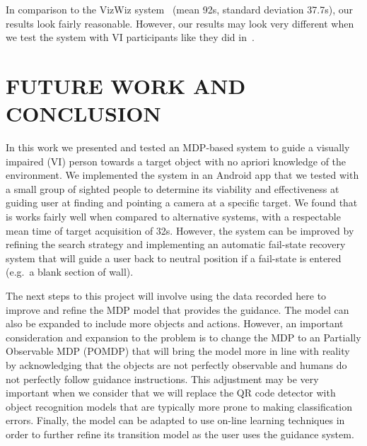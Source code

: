 \documentclass[a4paper, twoside]{article}
\begin{document}
In comparison to the VizWiz system~\cite{bigham2010vizwiz} (mean 92s, standard deviation 37.7s), our results look fairly reasonable. However, our results may look very different when we test the system with VI participants like they did in~\cite{bigham2010vizwiz}.

\section{\uppercase{Future Work and Conclusion}}\label{sec:conclusion}

\noindent In this work we presented and tested an MDP-based system to guide a visually impaired (VI) person towards a target object with no apriori knowledge of the environment. We implemented the system in an Android app that we tested with a small group of sighted people to determine its viability and effectiveness at guiding user at finding and pointing a camera at a specific target. We found that is works fairly well when compared to alternative systems, with a respectable mean time of target acquisition of 32s. However, the system can be improved by refining the search strategy and implementing an automatic fail-state recovery system that will guide a user back to neutral position if a fail-state is entered (e.g.\ a blank section of wall). 

The next steps to this project will involve using the data recorded here to improve and refine the MDP model that provides the guidance. The model can also be expanded to include more objects and actions. However, an important consideration and expansion to the problem is to change the MDP to an Partially Observable MDP (POMDP) that will bring the model more in line with reality by acknowledging that the objects are not perfectly observable and humans do not perfectly follow guidance instructions. This adjustment may be very important when we consider that we will replace the QR code detector with object recognition models that are typically more prone to making classification errors. Finally, the model can be adapted to use on-line learning techniques in order to further refine its transition model as the user uses the guidance system. 

\clearpage


\end{document}
